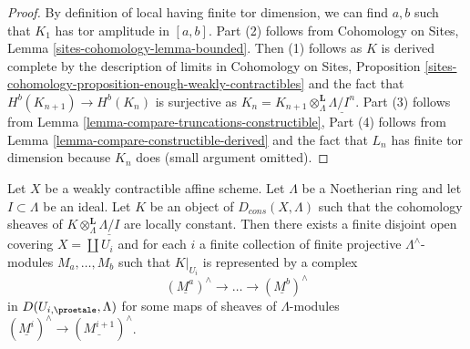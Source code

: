 \begin{proof}
By definition of local having finite tor dimension, we can find
$a, b$ such that $K_1$ has tor amplitude in $[a, b]$.
Part (2) follows from 
Cohomology on Sites, Lemma \ref{sites-cohomology-lemma-bounded}.
Then (1) follows as $K$ is derived complete by the description
of limits in
Cohomology on Sites, Proposition
\ref{sites-cohomology-proposition-enough-weakly-contractibles}
and the fact that $H^b(K_{n + 1}) \to H^b(K_n)$ is surjective
as $K_n = K_{n + 1} \otimes^\mathbf{L}_\Lambda \underline{\Lambda/I^n}$.
Part (3) follows from
Lemma \ref{lemma-compare-truncations-constructible},
Part (4) follows from
Lemma \ref{lemma-compare-constructible-derived}
and the fact that $L_n$ has finite tor dimension because $K_n$ does
(small argument omitted).
\end{proof}

\begin{lemma}
\label{lemma-local-structure-constructible-complex}
Let $X$ be a weakly contractible affine scheme. Let $\Lambda$ be a Noetherian
ring and let $I \subset \Lambda$ be an ideal. Let $K$ be an object of
$D_{cons}(X, \Lambda)$ such that the cohomology sheaves of
$K \otimes_\Lambda^\mathbf{L} \underline{\Lambda/I}$ are locally
constant. Then there exists a finite disjoint open covering
$X = \coprod U_i$ and for each $i$ a finite collection of
finite projective $\Lambda^\wedge$-modules $M_a, \ldots, M_b$
such that $K|_{U_i}$ is represented by a complex
$$
(\underline{M^a})^\wedge \to \ldots \to (\underline{M^b})^\wedge
$$
in $D(U_{i, \proetale}, \Lambda)$ for some maps of sheaves of
$\Lambda$-modules $(\underline{M^i})^\wedge \to (\underline{M^{i + 1}})^\wedge$.
\end{lemma}

